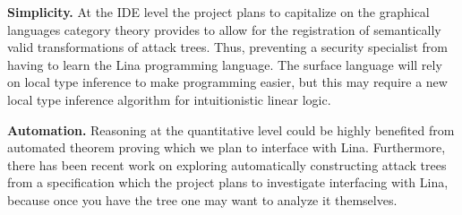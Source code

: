\documentclass{sigplanconf}
\begin{document}
\textbf{Simplicity.}  At the IDE level the project plans to capitalize
on the graphical languages category theory provides
\cite{Selinger:2009} to allow for the registration of semantically
valid transformations of attack trees.  Thus, preventing a security
specialist from having to learn the Lina programming language.  The
surface language will rely on local type inference to make programming
easier, but this may require a new local type inference algorithm for
intuitionistic linear logic.

\textbf{Automation.}  Reasoning at the quantitative level could be
highly benefited from automated theorem proving which we plan to
interface with Lina.  Furthermore, there has been recent work
\cite{essay69399,Sheyner:2002:AGA:829514.830526,6957121,essay69402} on
exploring automatically constructing attack trees from a specification
which the project plans to investigate interfacing with Lina, because
once you have the tree one may want to analyze it themselves.


\end{document}
